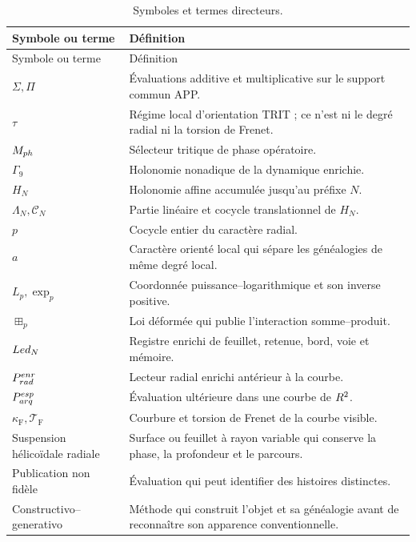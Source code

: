 \begin{longtable}{p{}p{}}
\caption{Symboles et termes directeurs.}
\label{espiral:tab:glosario}\\
\toprule
Symbole ou terme&Définition\\
\midrule
\endfirsthead
\toprule
Symbole ou terme&Définition\\
\midrule
\endhead
\(\Sigma,\Pi\)&Évaluations additive et multiplicative sur le support commun APP.\\
\(\tau\)&Régime local d'orientation TRIT ; ce n'est ni le degré radial ni la torsion de Frenet.\\
\(M_{ph}\)&Sélecteur tritique de phase opératoire.\\
\(\Gamma_9\)&Holonomie nonadique de la dynamique enrichie.\\
\(H_N\)&Holonomie affine accumulée jusqu'au préfixe \(N\).\\
\(\Lambda_N,\mathcal C_N\)&Partie linéaire et cocycle translationnel de \(H_N\).\\
\(p\)&Cocycle entier du caractère radial.\\
\(a\)&Caractère orienté local qui sépare les généalogies de même degré local.\\
\(L_p,\exp_p\)&Coordonnée puissance--logarithmique et son inverse positive.\\
\(\boxplus_p\)&Loi déformée qui publie l'interaction somme--produit.\\
\(Led_N\)&Registre enrichi de feuillet, retenue, bord, voie et mémoire.\\
\(P_{rad}^{enr}\)&Lecteur radial enrichi antérieur à la courbe.\\
\(P_{arq}^{esp}\)&Évaluation ultérieure dans une courbe de \(R^2\).\\
\(\kappa_{\mathrm{F}},\mathcal T_{\mathrm{F}}\)&Courbure et torsion de Frenet de la courbe visible.\\
Suspension hélicoïdale radiale&Surface ou feuillet à rayon variable qui conserve la phase, la profondeur et le parcours.\\
Publication non fidèle&Évaluation qui peut identifier des histoires distinctes.\\
Constructivo--generativo&Méthode qui construit l'objet et sa généalogie avant de reconnaître son apparence conventionnelle.\\
\bottomrule
\end{longtable}
